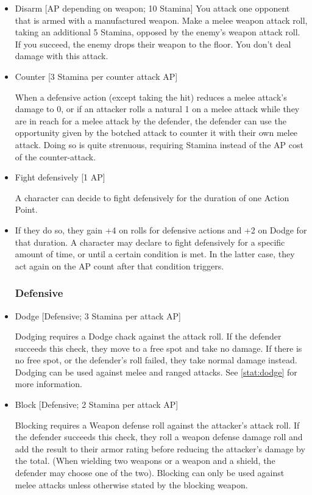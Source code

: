 \begin{itemize}
\item Disarm [AP depending on weapon; 10 Stamina]
You attack one opponent that is armed with a manufactured weapon.
Make a melee weapon attack roll, taking an additional 5 Stamina, opposed by the enemy's weapon attack roll.
If you succeed, the enemy drops their weapon to the floor.
You don't deal damage with this attack.\\


\item Counter [3 Stamina per counter attack AP]

When a defensive action (except taking the hit) reduces a melee attack's damage to 0, or if an attacker rolls a natural 1 on a melee attack while they are in reach for a melee attack by the defender, the defender can use the opportunity given by the botched attack to counter it with their own melee attack.
Doing so is quite strenuous, requiring Stamina instead of the AP cost of the counter-attack.


\item Fight defensively [1 AP]

A character can decide to fight defensively for the duration of one Action Point.

\item If they do so, they gain +4 on rolls for defensive actions and +2 on Dodge for that duration.
A character may declare to fight defensively for a specific amount of time, or until a certain condition is met.
In the latter case, they act again on the AP count after that condition triggers.

\subsubsection{Defensive}


\item Dodge [Defensive; 3 Stamina per attack AP]

Dodging requires a Dodge chack against the attack roll.
If the defender succeeds this check, they move  to a free spot and take no damage.
If there is no free spot, or the defender's roll failed, they take normal damage instead.
Dodging can be used against melee and ranged attacks.
See \ref{stat:dodge} for more information.

\item Block [Defensive; 2 Stamina per attack AP]

Blocking requires a Weapon defense roll against the attacker's attack roll.
If the defender succeeds this check, they roll a weapon defense damage roll and add the result to their armor rating before reducing the attacker's damage by the total.
(When wielding two weapons or a weapon and a shield, the defender may choose one of the two).
Blocking can only be used against melee attacks unless otherwise stated by the blocking weapon.


\end{itemize}
